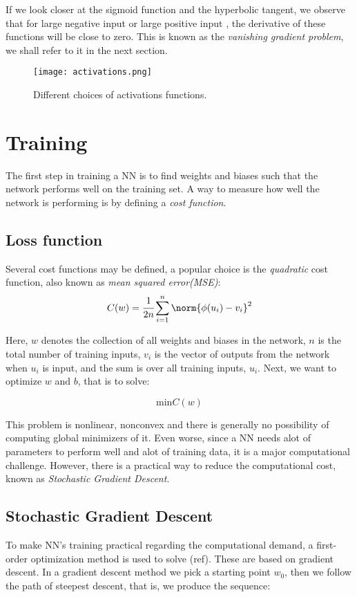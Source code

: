 If we look closer at the sigmoid function and the hyperbolic tangent, we observe that for large negative input or large positive input , the derivative of these functions will be close to zero. This is known as the \emph{vanishing gradient problem}, we shall refer to it in the next section.

\begin{figure}
\centerline{\texttt{[image: activations.png]}}
\caption{Different choices of activations functions.}
\end{figure}

 
\section{Training}

The first step in training a NN is to find weights and biases such that the network performs well on the training set. A way to measure how well the network is performing is by defining a \emph{cost function}.
\subsection{Loss function}
Several cost functions may be defined, a popular choice is the \emph{quadratic} cost function, also known as \emph{mean squared error(MSE)}:
\begin{equation}
C(w)=\cfrac{1}{2n}\sum_{i=1}^{n}\norm{\phi(u_i)-v_i}^2
\end{equation}

Here, $w$ denotes the collection of all weights and biases in the network, $n$ is the total number of training inputs, $v_i$ is the vector of outputs from the network when $u_i$ is input, and the sum is over all training inputs, $u_i$. Next, we want to optimize $w$ and $b$, that is to solve: 

\begin{equation}
\text{min}  C(w)
\end{equation}

This problem is nonlinear, nonconvex and there is generally no possibility of computing global minimizers of it. Even worse, since a NN needs alot of parameters to perform well and alot of training data, it is a major computational challenge. However, there is a practical way to reduce the computational cost, known as \emph{Stochastic Gradient Descent}.

\subsection{Stochastic Gradient Descent}
To make NN's training practical regarding the computational demand, a first-order optimization method is used to solve (ref). These are based on gradient descent. In a gradient descent method we pick a starting point $w_0$, then we follow the path of steepest descent, that is, we produce the sequence:


